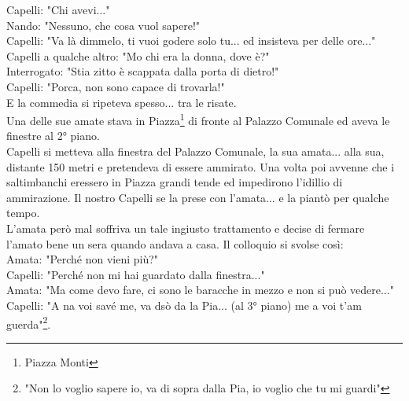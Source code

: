 \documentclass[10pt]{memoir} %
\begin{document}
Capelli: "Chi avevi..."\\
Nando: "Nessuno, che cosa vuol sapere!"\\
Capelli: "Va là dimmelo, ti vuoi godere solo tu... ed insisteva per delle ore..."\\
Capelli a qualche altro: "Mo chi era la donna, dove è?"\\
Interrogato: "Stia zitto è scappata dalla porta di dietro!"\\
Capelli: "Porca, non sono capace di trovarla!"\\
E la commedia si ripeteva spesso... tra le risate.\\
Una delle sue amate stava in Piazza\footnote{Piazza Monti} di fronte al Palazzo Comunale ed aveva le finestre al 2° piano.\\
Capelli si metteva alla finestra del Palazzo Comunale, la sua amata... alla sua, distante 150 metri e pretendeva di essere ammirato. Una volta poi avvenne che i saltimbanchi eressero in Piazza grandi tende ed impedirono l'idillio di ammirazione. Il nostro Capelli se la prese con l'amata... e la piantò per qualche tempo.\\
L'amata però mal soffriva un tale ingiusto trattamento e decise di fermare l'amato bene un sera quando andava a casa. Il colloquio si svolse così:\\
Amata: "Perché non vieni più?"\\
Capelli: "Perché non mi hai guardato dalla finestra..."\\
Amata: "Ma come devo fare, ci sono le baracche in mezzo e non si può vedere..."\\
Capelli: "A na voi savé me, va dsò da la Pia... (al 3° piano) me a voi t'am guerda"\footnote{"Non lo voglio sapere io, va di sopra dalla Pia, io voglio che tu mi guardi"}.\\
\newpage
\end{document}
